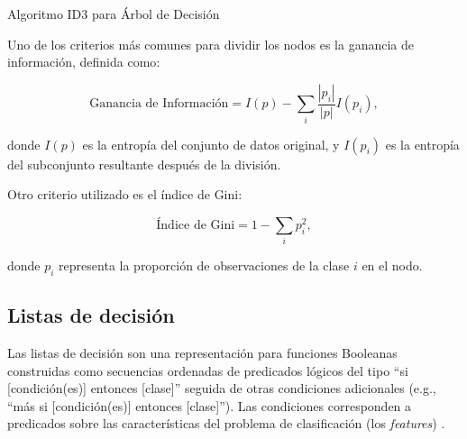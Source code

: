 \begin{algorithm}[H]
\caption{Algoritmo ID3 para Árbol de Decisión}

\end{algorithm}

Uno de los criterios más comunes para dividir los nodos es la ganancia de información, definida como:

\begin{equation}
\text{Ganancia de Información} = I(p) - \sum_{i} \frac{|p_i|}{|p|} I(p_i),
\end{equation}

donde \( I(p) \) es la entropía del conjunto de datos original, y \( I(p_i) \) es la entropía del subconjunto resultante después de la división.

Otro criterio utilizado es el índice de Gini:

\begin{equation}
\text{Índice de Gini} = 1 - \sum_{i} p_i^2,
\end{equation}

donde \( p_i \) representa la proporción de observaciones de la clase \( i \) en el nodo.

\subsection{Listas de decisión}

Las listas de decisión son una representación para funciones Booleanas construidas como secuencias ordenadas de predicados lógicos del tipo “si [condición(es)] entonces [clase]” seguida de otras condiciones adicionales (e.g., “más si [condición(es)] entonces [clase]”). Las condiciones corresponden a predicados sobre las características del problema de clasificación (los \emph{features}) \cite{Liu-2015, Letham-2015, Rivest-1987}.

